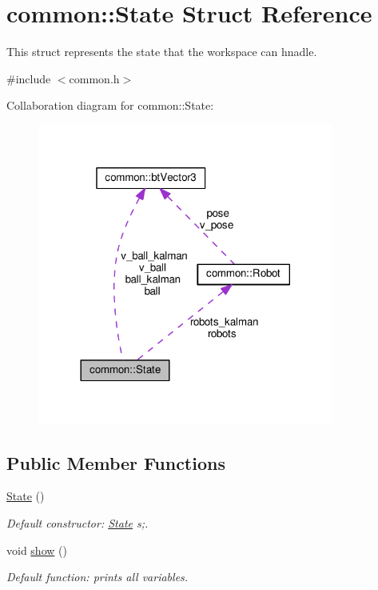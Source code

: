 \hypertarget{structcommon_1_1State}{}\section{common\+:\+:State Struct Reference}
\label{structcommon_1_1State}


This struct represents the state that the workspace can hnadle.  




{\ttfamily \#include $<$common.\+h$>$}



Collaboration diagram for common\+:\+:State\+:\nopagebreak
\begin{figure}[H]
\begin{center}
\leavevmode
\includegraphics[width=276pt]{structcommon_1_1State__coll__graph}
\end{center}
\end{figure}
\subsection*{Public Member Functions}
\begin{DoxyCompactItemize}
\item 
\hyperlink{structcommon_1_1State_ac8dcfb15646bb310c85161de2900c8c6}{State} ()\hypertarget{structcommon_1_1State_ac8dcfb15646bb310c85161de2900c8c6}{}\label{structcommon_1_1State_ac8dcfb15646bb310c85161de2900c8c6}

\begin{DoxyCompactList}\small\item\em Default constructor\+: \hyperlink{structcommon_1_1State}{State} s;. \end{DoxyCompactList}\item 
void \hyperlink{structcommon_1_1State_af0a474961bf0f3afe274ce27da0f28a3}{show} ()\hypertarget{structcommon_1_1State_af0a474961bf0f3afe274ce27da0f28a3}{}\label{structcommon_1_1State_af0a474961bf0f3afe274ce27da0f28a3}

\begin{DoxyCompactList}\small\item\em Default function\+: prints all variables. \end{DoxyCompactList}\end{DoxyCompactItemize}
